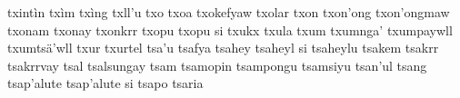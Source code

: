 \documentclass[a4paper]{article}
\begin{document}
txintìn\hspace{2mm}
txìm\hspace{2mm}
txìng\hspace{2mm}
txll'u\hspace{2mm}
txo\hspace{2mm}
txoa\hspace{2mm}
txokefyaw\hspace{2mm}
txolar\hspace{2mm}
txon\hspace{2mm}
txon'ong\hspace{2mm}
txon'ongmaw\hspace{2mm}
txonam\hspace{2mm}
txonay\hspace{2mm}
txonkrr\hspace{2mm}
txopu\hspace{2mm}
txopu si\hspace{2mm}
txukx\hspace{2mm}
txula\hspace{2mm}
txum\hspace{2mm}
txumnga'\hspace{2mm}
txumpaywll\hspace{2mm}
txumtsä'wll\hspace{2mm}
txur\hspace{2mm}
txurtel\hspace{2mm}
tsa'u\hspace{2mm}
tsafya\hspace{2mm}
tsahey\hspace{2mm}
tsaheyl si\hspace{2mm}
tsaheylu\hspace{2mm}
tsakem\hspace{2mm}
tsakrr\hspace{2mm}
tsakrrvay\hspace{2mm}
tsal\hspace{2mm}
tsalsungay\hspace{2mm}
tsam\hspace{2mm}
tsamopin\hspace{2mm}
tsampongu\hspace{2mm}
tsamsiyu\hspace{2mm}
tsan'ul\hspace{2mm}
tsang\hspace{2mm}
tsap'alute\hspace{2mm}
tsap'alute si\hspace{2mm}
tsapo\hspace{2mm}
tsaria\hspace{2mm}
\end{document}
